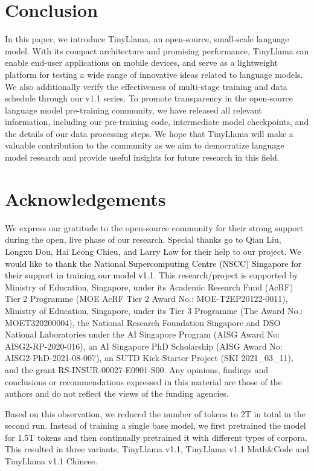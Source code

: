 \documentclass{article}
\begin{document}
\section{Conclusion}
In this paper, we introduce TinyLlama, an open-source, small-scale language model.
With its compact architecture and promising performance, TinyLlama can enable end-user applications on mobile devices, and serve as a lightweight platform for testing a wide range of innovative ideas related to language models. We also additionally verify the effectiveness of multi-stage training and data schedule through our v1.1 series. To promote transparency in the open-source language model pre-training community, we have released all relevant information, including our pre-training code, intermediate model checkpoints, and the details of our data processing steps. We hope that TinyLlama will make a valuable contribution to the community as we aim to democratize language model research and provide useful insights for future research in this field.
\section*{Acknowledgements}
We express our gratitude to the open-source community for their strong support during the open, live phase of our research. Special thanks go to Qian Liu, Longxu Dou, Hai Leong Chieu, and Larry Law for their help to our project.
\textcolor{black}{We would like to thank the National Supercomputing Centre (NSCC) Singapore for their support in training our model v1.1.}
This research/project is supported by Ministry of Education, Singapore, under its Academic Research Fund (AcRF) Tier 2 Programme (MOE AcRF Tier 2 Award No.: MOE-T2EP20122-0011), Ministry of Education, Singapore, under its Tier 3 Programme (The Award No.: MOET320200004), the National Research Foundation Singapore and DSO National Laboratories under the AI Singapore Program (AISG Award No: AISG2-RP-2020-016), an AI Singapore PhD Scholarship (AISG Award No: AISG2-PhD-2021-08-007), an SUTD Kick-Starter Project (SKI 2021\_03\_11), and the grant RS-INSUR-00027-E0901-S00. Any opinions, findings and conclusions or recommendations expressed in this material are those of the authors and do not reflect the views of the funding agencies.


\appendix
Based on this observation, we reduced the number of tokens to 2T in total in the second run.
Instead of training a single base model, we first pretrained the model for 1.5T tokens and then continually pretrained it with different types of corpora. This resulted in three variants, TinyLlama v1.1, TinyLlama v1.1 Math\&Code and TinyLlama v1.1 Chinese.
\end{document}
